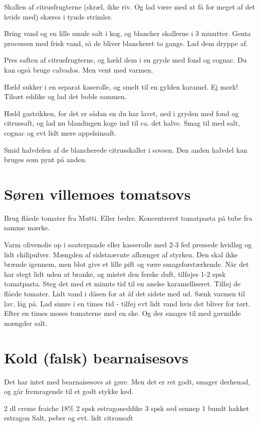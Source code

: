 \documentclass[
]{book}
\begin{document}
Skallen af citrusfrugterne (skræl, ikke riv. Og lad være med at få for meget af det hvide med) skæres i tynde strimler.

Bring vand og en lille smule salt i kog, og blancher skallerne i 3 minutter. Genta processen med frisk vand, så de bliver blancheret to gange. Lad dem dryppe af.

Pres saften af citrusfrugterne, og hæld dem i en gryde med fond og cognac. Du kan også bruge calvados. Men vent med varmen.

Hæld sukker i en separat kaserolle, og smelt til en gylden karamel. Ej mørk! Tilsæt eddike og lad det boble sammen.

Hæld gastrikken, for det er sådan en du har lavet, ned i gryden med fond og citrussaft, og lad nu blandingen koge ind til ca. det halve. Smag til med salt, cognac og evt lidt mere appelsinsaft.

Smid halvdelen af de blancherede citrusskaller i sovsen. Den anden halvdel kan bruges som pynt på anden.

\section{Søren villemoes tomatsovs}\label{suxf8ren-villemoes-tomatsovs}

Brug flåede tomater fra Mutti. Eller bedre.
Koncentreret tomatpasta på tube fra samme mærke.

Varm olivenolie op i sauterpande eller kasserolle med 2-3 fed pressede hvidløg og
lidt chilipulver. Mængden af sidstnævnte afhænger af styrken. Den skal ikke
brænde igennem, men blot give et lille pift og være smagsforstærkende.
Når det har stegt lidt uden at branke, og mistet den ferske duft, tilføjes
1-2 spsk tomatpasta. Steg det med et minuts tid til en anelse karamelliseret.
Tilføj de flåede tomater. Lidt vand i dåsen for at åf det sidste med ud.
Sænk varmen til lav, låg på. Lad simre i en times tid - tilføj evt lidt
vand hvis det bliver for tørt. Efter en times moses tomaterne med en ske. Og
der smages til med gavmilde mængder salt.

\section{Kold (falsk) bearnaisesovs}\label{kold-falsk-bearnaisesovs}

Det har intet med bearnaisesovs at gøre. Men det er ret godt, smager derhenad, og går fremragende til et godt stykke kød.~

2 dl creme fraiche 18\%
2 spsk estragoneddike
3 spsk sød sennep
1 bundt hakket estragon
Salt, peber og evt. lidt citronsaft
\end{document}
